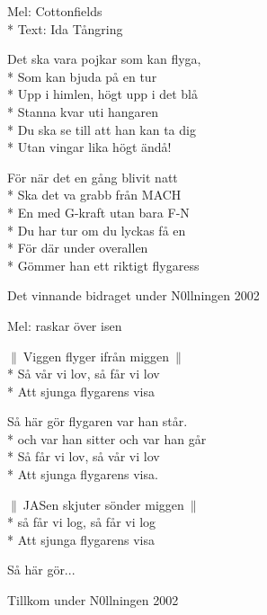\begin{SongText}
    \begin{SongInfo}
        Mel: Cottonfields\\*%
        Text: Ida Tångring    
    \end{SongInfo}
    \begin{SongVerse}
        Det ska vara pojkar som kan flyga,\\*%
        Som kan bjuda på en tur\\*%
        Upp i himlen, högt upp i det blå\\*%
        Stanna kvar uti hangaren\\*%
        Du ska se till att han kan ta dig\\*%
        Utan vingar lika högt ändå!
    \end{SongVerse}
    \begin{SongVerse}
        För när det en gång blivit natt\\*%
        Ska det va grabb från MACH\\*%
        En med G-kraft utan bara F-N\\*%
        Du har tur om du lyckas få en\\*%
        För där under overallen\\*%
        Gömmer han ett riktigt flygaress
    \end{SongVerse}
    \begin{SongInfo}
        Det vinnande bidraget under N0llningen 2002
    \end{SongInfo}
\end{SongText}
\begin{SongText}[Flygarvisan]
    \begin{SongInfo}
        Mel: raskar över isen
    \end{SongInfo}
    \begin{SongVerse}
        $\|\:$Viggen flyger ifrån miggen$\:\|$\\*%
        Så vår vi lov, så får vi lov\\*%
        Att sjunga flygarens visa
    \end{SongVerse}
    \begin{SongVerse}
        Så här gör flygaren var han står.\\*%
        och var han sitter och var han går\\*%
        Så får vi lov, så vår vi lov\\*%
        Att sjunga flygarens visa.
    \end{SongVerse}
    \begin{SongVerse}
        $\|\:$JASen skjuter sönder miggen$\:\|$\\*%
        så får vi log, så får vi log\\*%
        Att sjunga flygarens visa
    \end{SongVerse}
    \begin{SongVerse}
        Så här gör...
    \end{SongVerse}
    \begin{SongInfo}
        Tillkom under N0llningen 2002
    \end{SongInfo}
\end{SongText}
